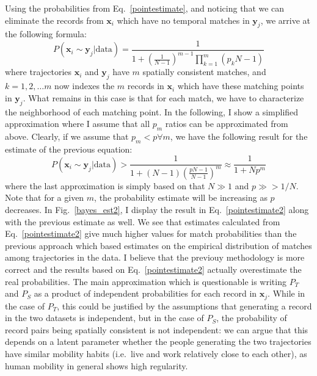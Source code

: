 \documentclass[a4paper]{article}
\renewcommand{\vec}[1]{\mathbf{#1}}
\begin{document}
		Using the probabilities from Eq.~\ref{pointestimate}, and noticing that we can eliminate the records from $\vec{x}_i$ which have no temporal
		matches in $\vec{y}_j$, we arrive at the following formula:
		\begin{equation}
			P( \vec{x}_i \sim \vec{y}_j | \textrm{data} ) = \frac{1}{1 + \left( \frac{1}{N-1} \right)^{m-1} \prod_{k=1}^m (p_k N - 1)}
		\end{equation}
		where trajectories $\vec{x}_i$ and $\vec{y}_j$ have $m$ spatially consistent matches, and $k = 1,2,\ldots m$ now indexes the $m$ records in
		$\vec{x}_i$ which have these matching points in $\vec{y}_j$. What remains in this case is that for each match, we have to characterize the
		neighborhood of each matching point. In the following, I show a simplified approximation where I assume that all $p_m$ ratios can be
		approximated from above. Clearly, if we assume that $p_m < p \forall m$, we have the following result for the estimate of the previous equation:
		\begin{equation}
			P( \vec{x}_i \sim \vec{y}_j | \textrm{data} ) > \frac{1}{1 + (N-1) \left (\frac{pN - 1}{N-1}\right)^m} \approx
				\frac{1}{1 + N p^m}
			\label{pointestimate2}
		\end{equation}
		where the last approximation is simply based on that $N \gg 1$ and $p \gg > 1/N$. Note that for a given $m$, the probability estimate will
		be increasing as $p$ decreases. In Fig.~\ref{bayes_est2}, I display the result in Eq.~\ref{pointestimate2} along with the previous estimate as
		well. We see that estimates calculated from Eq.~\ref{pointestimate2} give much higher values for match probabilities than the previous approach
		which based estimates on the empirical distribution of matches among trajectories in the data. I believe that the previouy methodology is more
		correct and the results based on Eq.~\ref{pointestimate2} actually overestimate the real probabilities. The main approximation which is
		questionable is writing $P_T$ and $P_S$ as a product of independent probabilities for each record in $\vec{x}_j$. While in the case of $P_T$,
		this could be justified by the assumptions that generating a record in the two datasets is independent, but in the case of $P_S$, the
		probability of record pairs being spatially consistent is not independent: we can argue that this depends on a latent parameter whether the
		people generating the two trajectories have similar mobility habits (i.e.~live and work relatively close to each other), as human mobility in
		general shows high regularity.
		
\end{document}
